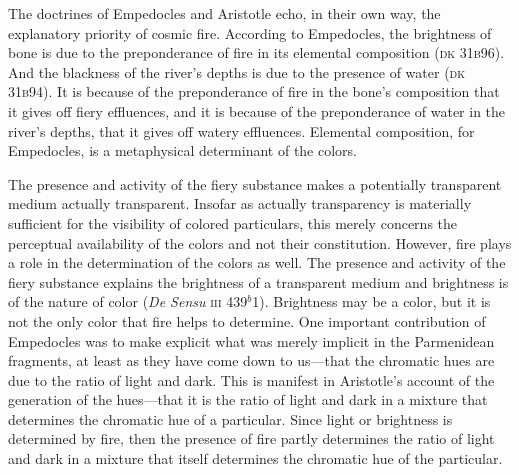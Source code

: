 The doctrines of Empedocles and Aristotle echo, in their own way, the explanatory priority of cosmic fire. According to Empedocles, the brightness of bone is due to the preponderance of fire in its elemental composition (\textsc{dk} 31\textsc{b}96). And the blackness of the river's depths is due to the presence of water (\textsc{dk} 31\textsc{b}94). It is because of the preponderance of fire in the bone's composition that it gives off fiery effluences, and it is because of the preponderance of water in the river's depths, that it gives off watery effluences. Elemental composition, for Empedocles, is a metaphysical determinant of the colors.

The presence and activity of the fiery substance makes a potentially transparent medium actually transparent. Insofar as actually transparency is materially sufficient for the visibility of colored particulars, this merely concerns the perceptual availability of the colors and not their constitution. However, fire plays a role in the determination of the colors as well. The presence and activity of the fiery substance explains the brightness of a transparent medium and brightness is of the nature of color (\emph{De Sensu} \textsc{iii} 439\( ^{b} \)1). Brightness may be a color, but it is not the only color that fire helps to determine. One important contribution of Empedocles was to make explicit what was merely implicit in the Parmenidean fragments, at least as they have come down to us---that the chromatic hues are due to the ratio of light and dark. This is manifest in Aristotle's account of the generation of the hues---that it is the ratio of light and dark in a mixture that determines the chromatic hue of a particular. Since light or brightness is determined by fire, then the presence of fire partly determines the ratio of light and dark in a mixture that itself determines the chromatic hue of the particular.


